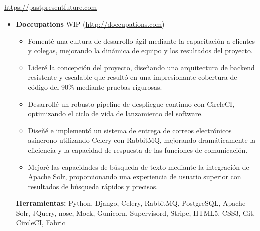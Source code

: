 \documentclass[11pt,a4paper,english]{moderncv}
\begin{document}
\subsection{}

{
    \url{https://pastpresentfuture.com}
\newline{}
\begin{itemize}
    \item \textbf{Doccupations}
        \newline{}
        WIP (\url{http://doccupations.com})
        \begin{itemize}
            \item Fomenté una cultura de desarrollo ágil mediante la capacitación a clientes y colegas, mejorando la dinámica de equipo y los resultados del proyecto.
            \item Lideré la concepción del proyecto, diseñando una arquitectura de backend resistente y escalable que resultó en una impresionante cobertura de código del 90\% mediante pruebas rigurosas.
            \item Desarrollé un robusto pipeline de despliegue continuo con CircleCI, optimizando el ciclo de vida de lanzamiento del software.
            \item Diseñé e implementó un sistema de entrega de correos electrónicos asíncrono utilizando Celery con RabbitMQ, mejorando dramáticamente la eficiencia y la capacidad de respuesta de las funciones de comunicación.
            \item Mejoré las capacidades de búsqueda de texto mediante la integración de Apache Solr, proporcionando una experiencia de usuario superior con resultados de búsqueda rápidos y precisos.
        \end{itemize}
        \textbf{Herramientas:} Python, Django, Celery, RabbitMQ, PostgreSQL, Apache Solr, JQuery, nose, Mock, Gunicorn, Supervisord, Stripe, HTML5, CSS3, Git, CircleCI, Fabric
\end{itemize}
}

\subsection{}
\end{document}
